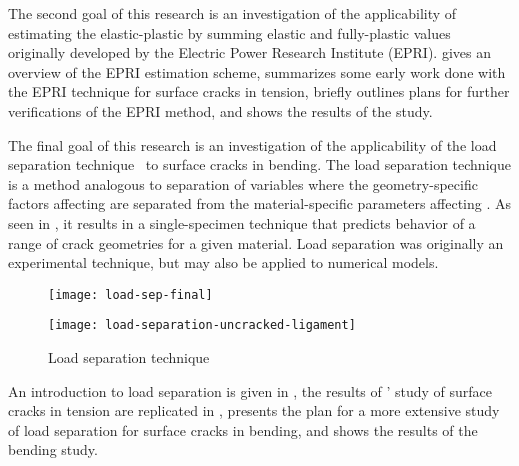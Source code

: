 The second goal of this research is an investigation of the applicability of estimating the elastic-plastic \J by summing elastic and fully-plastic \J values originally developed by the Electric Power Research Institute (EPRI).
 gives an overview of the EPRI estimation scheme,
 summarizes some early work done with the EPRI technique for surface cracks in tension,
 briefly outlines plans for further verifications of the EPRI method,
and
 shows the results of the study.

The final goal of this research is an investigation of the applicability of the load separation technique~\citep{sharobeamlandes1991} to surface cracks in bending.
The load separation technique is a method analogous to separation of variables where the geometry-specific factors affecting \J are separated from the material-specific parameters affecting \J.
As seen in , it results in a single-specimen technique that predicts behavior of a range of crack geometries for a given material.
Load separation was originally an experimental technique, but may also be applied to numerical models.
\begin{figure}[tbp]
\centering%
\begin{minipage}[t]{0.45\columnwidth}%
\centering%
\texttt{[image: load-sep-final]}
%
\end{minipage}%
\begin{minipage}[t]{0.45\columnwidth}%
\centering%
\texttt{[image: load-separation-uncracked-ligament]}%
%
\end{minipage}%
\caption[Load separation technique]{\label{fig:loadsep} Load separation technique \citep{sharobeamlandes1991}}%
\end{figure}
An introduction to load separation is given in , 
the results of \citeauthor{sharobeamlandes1993}' study of surface cracks in tension \cite{sharobeamlandes1993} are replicated in ,
 presents the plan for a more extensive study of load separation for surface cracks in bending,
and
 shows the results of the bending study.
